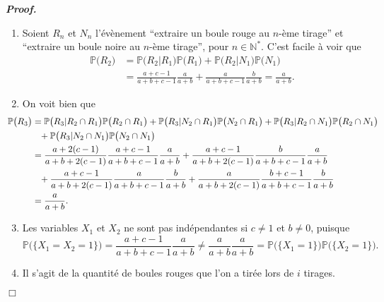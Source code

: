 \documentclass[11pt,a4paper]{article}
\newcommand{\NN}{\mathbb{N}}
\newenvironment{preuve}[1][]
{\vskip 2mm  \noindent\emph{\bf Proof#1. }}{$\Box$ \vskip 2mm}
\begin{document}
		\begin{preuve}
			\begin{enumerate}
				\item Soient $R_{n}$ et $N_{n}$ l'évènement ``extraire un boule rouge au $n$-ème tirage'' et ``extraire un boule noire au $n$-ème tirage'', 
				pour $n \in \NN^{*}$. 
				C'est facile à voir que 
				\begin{align*}
				\mathbb{P}\big(R_{2}\big) &= \mathbb{P}\big(R_{2} | R_{1}\big) \mathbb{P}\big(R_{1}\big) + \mathbb{P}\big(R_{2} | N_{1}\big) \mathbb{P}\big(N_{1}\big) 
				\\
				&= \frac{a+c-1}{a+b+c-1} \frac{a}{a+b} + \frac{a}{a+b+c-1} \frac{b}{a+b} = \frac{a}{a+b}.
				\end{align*}       
				
				\item On voit bien que 
				\begin{align*}
				\hskip -0.6cm   \mathbb{P}\big(R_{3}\big) &= \mathbb{P}\big(R_{3} | R_{2} \cap R_{1} \big) \mathbb{P}\big(R_{2} \cap R_{1}\big) + \mathbb{P}\big(R_{3} | N_{2} \cap R_{1} \big) \mathbb{P}\big(N_{2} \cap R_{1}\big) + \mathbb{P}\big(R_{3} | R_{2} \cap N_{1} \big) \mathbb{P}\big(R_{2} \cap N_{1}\big) 
				\\
				&\phantom{=}+ \mathbb{P}\big(R_{3} | N_{2} \cap N_{1} \big) \mathbb{P}\big(N_{2} \cap N_{1}\big)
				\\
				&= \frac{a+2(c-1)}{a+b+2(c-1)} \frac{a+c-1}{a+b+c-1} \frac{a}{a+b} + \frac{a+c-1}{a+b+2(c-1)} \frac{b}{a+b+c-1} \frac{a}{a+b} 
				\\
				&\phantom{=}+ \frac{a+c-1}{a+b+2(c-1)} \frac{a}{a+b+c-1} \frac{b}{a+b} + \frac{a}{a+b+2(c-1)} \frac{b+c-1}{a+b+c-1} \frac{b}{a+b}
				\\
				&= \frac{a}{a+b}. 
				\end{align*}   
				
				\item Les variables $X_1$ et $X_2$ ne sont pas indépendantes si $c \neq 1$ et $b \neq 0$, puisque
				\[     \mathbb{P}\big(\{X_{1} = X_{2} = 1\}\big) = \frac{a+c-1}{a+b+c-1} \frac{a}{a+b} \neq \frac{a}{a+b} \frac{a}{a+b} = \mathbb{P}\big(\{X_{1} = 1\}\big) \mathbb{P}\big(\{X_{2} = 1 \}\big).     \]
				
				\item Il s'agit de la quantité de boules rouges que l'on a tirée lors de $i$ tirages. 
				

\end{enumerate}
\end{preuve}
\end{document}
